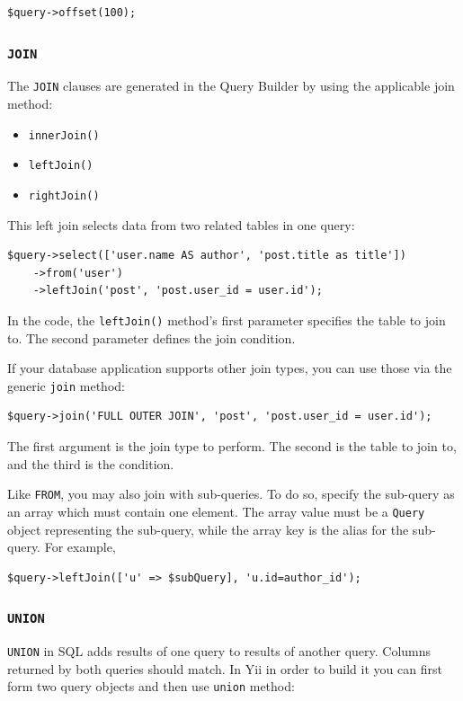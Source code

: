 \lstset{language=php}\begin{lstlisting}
$query->offset(100);
\end{lstlisting}
\subsubsection{\lstinline|JOIN|}
The \lstinline|JOIN| clauses are generated in the Query Builder by using the applicable join method:

\begin{itemize}
\item \lstinline|innerJoin()|
\item \lstinline|leftJoin()|
\item \lstinline|rightJoin()|
\end{itemize}
This left join selects data from two related tables in one query:

\lstset{language=php}\begin{lstlisting}
$query->select(['user.name AS author', 'post.title as title'])
    ->from('user')
    ->leftJoin('post', 'post.user_id = user.id');
\end{lstlisting}
In the code, the \lstinline|leftJoin()| method's first parameter
specifies the table to join to. The second parameter defines the join condition.

If your database application supports other join types, you can use those via the  generic \lstinline|join| method:

\lstset{language=php}\begin{lstlisting}
$query->join('FULL OUTER JOIN', 'post', 'post.user_id = user.id');
\end{lstlisting}
The first argument is the join type to perform. The second is the table to join to, and the third is the condition.

Like \lstinline|FROM|, you may also join with sub-queries. To do so, specify the sub-query as an array
which must contain one element. The array value must be a \lstinline|Query| object representing the sub-query,
while the array key is the alias for the sub-query. For example,

\lstset{language=php}\begin{lstlisting}
$query->leftJoin(['u' => $subQuery], 'u.id=author_id');
\end{lstlisting}
\subsubsection{\lstinline|UNION|}
\lstinline|UNION| in SQL adds results of one query to results of another query. Columns returned by both queries should match.
In Yii in order to build it you can first form two query objects and then use \lstinline|union| method:


